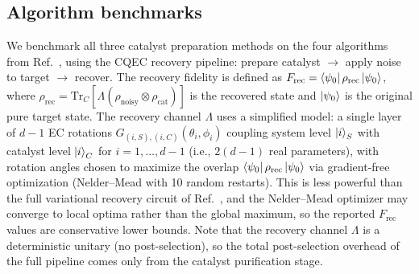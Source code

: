 \documentclass[prx,twocolumn,superscriptaddress,longbibliography,floatfix]{revtex4-2}
\begin{document}
\subsection{Algorithm benchmarks}
\label{sec:alg_bench}

We benchmark all three catalyst preparation methods on the four algorithms from Ref.~\cite{Wakaura2026}, using the CQEC recovery pipeline: prepare catalyst $\to$ apply noise to target $\to$ recover.
The recovery fidelity is defined as $F_\mathrm{rec} = \bra{\psi_0}\rho_\mathrm{rec}\ket{\psi_0}$, where $\rho_\mathrm{rec} = \mathrm{Tr}_C[\Lambda(\rho_\mathrm{noisy} \otimes \rho_\mathrm{cat})]$ is the recovered state and $\ket{\psi_0}$ is the original pure target state.
The recovery channel $\Lambda$ uses a simplified model: a single layer of $d-1$ EC rotations $G_{(i,S),(i,C)}(\theta_i, \phi_i)$ coupling system level $\ket{i}_S$ with catalyst level $\ket{i}_C$ for $i = 1, \ldots, d-1$ (i.e., $2(d-1)$ real parameters), with rotation angles chosen to maximize the overlap $\bra{\psi_0}\rho_\mathrm{rec}\ket{\psi_0}$ via gradient-free optimization (Nelder--Mead with 10 random restarts).
This is less powerful than the full variational recovery circuit of Ref.~\cite{Wakaura2026}, and the Nelder--Mead optimizer may converge to local optima rather than the global maximum, so the reported $F_\mathrm{rec}$ values are conservative lower bounds.
Note that the recovery channel $\Lambda$ is a deterministic unitary (no post-selection), so the total post-selection overhead of the full pipeline comes only from the catalyst purification stage.
\end{document}
